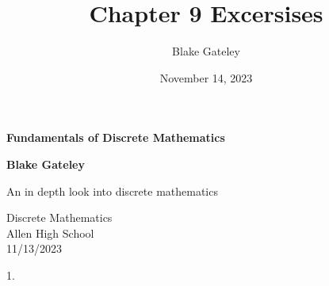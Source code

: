 \documentclass[12pt]{article}
\title{Chapter 9 Excersises}
\author{Blake Gateley}
\date{November 14, 2023}
\begin{document}
\begin{titlepage}
   \begin{center}
       \vspace*{1cm}

       {\Huge \textbf{Fundamentals of Discrete Mathematics}}

       \vspace{0.5cm}
            
       \vspace{1.5cm}

       \textbf{Blake Gateley}

      
       
       \vfill
            
       An in depth look into discrete mathematics
            
       \vspace{0.8cm}
     
   
            
       Discrete Mathematics\\
       Allen High School\\
       11/13/2023
            
   \end{center}
\end{titlepage}

\newpage
1.
\end{document}
